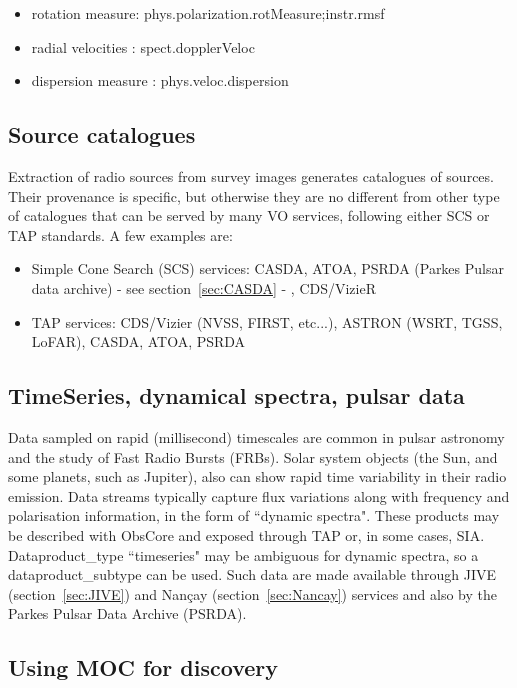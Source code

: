 \documentclass[11pt,a4paper]{ivoa}
\begin{document}
\begin{itemize}
    \item rotation measure: phys.polarization.rotMeasure;instr.rmsf
    \item radial velocities : spect.dopplerVeloc
    \item dispersion measure : phys.veloc.dispersion
\end{itemize}

\subsection{Source catalogues}
Extraction of radio sources from survey images generates catalogues of sources. Their provenance is specific, but otherwise they are no different from other type of catalogues that can be served by many VO services, following either SCS \citep{std:SCS} or TAP standards. A few examples are:
\begin{itemize}
\item Simple Cone Search (SCS) services: CASDA, ATOA, PSRDA (Parkes Pulsar data archive) - see section~\ref{sec:CASDA} - , CDS/VizieR
\item TAP services: CDS/Vizier (NVSS, FIRST, etc...), ASTRON (WSRT, TGSS, LoFAR), CASDA, ATOA, PSRDA 
\end{itemize}


\subsection{TimeSeries, dynamical spectra, pulsar data}

Data sampled on rapid (millisecond) timescales are common in pulsar astronomy and the study of Fast Radio Bursts (FRBs). 
Solar system objects (the Sun, and some planets, such as Jupiter), also can show rapid time variability in their radio emission. Data streams typically capture flux variations along with frequency and polarisation information, in the form of ``dynamic spectra".
These products may be described with ObsCore and exposed through TAP or, in some cases, SIA. Dataproduct\_type ``timeseries" may be ambiguous for dynamic spectra, so a dataproduct\_subtype can be used. Such data are made available through JIVE (section~\ref{sec:JIVE}) and Nan\c cay (section~\ref{sec:Nancay}) services and also by the Parkes Pulsar Data Archive (PSRDA).

\subsection{Using MOC for discovery}
\end{document}
